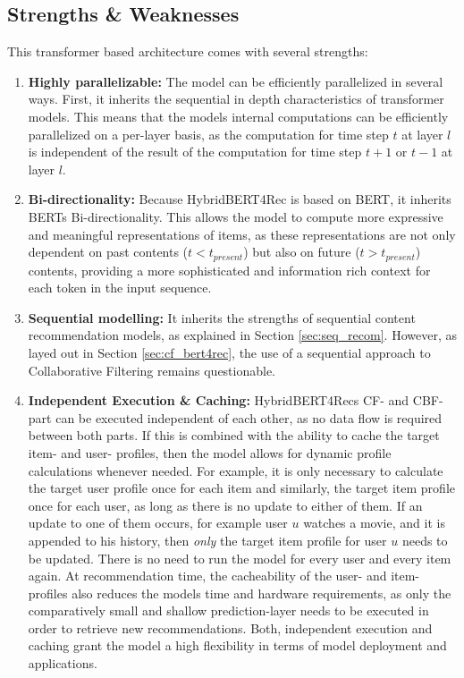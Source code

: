 \documentclass{Academic}
\begin{document}
        \subsection{Strengths \& Weaknesses}
        This transformer based architecture comes with several strengths:
        \begin{enumerate}
            \item \textbf{Highly parallelizable:} The model can be efficiently parallelized in several ways. First, it inherits the sequential in depth characteristics of transformer models. This means that the models internal computations can be efficiently parallelized on a per-layer basis, as the computation for time step $t$ at layer $l$ is independent of the result of the computation for time step $t+1$ or $t-1$ at layer $l$.
            \item \textbf{Bi-directionality:} Because HybridBERT4Rec is based on BERT, it inherits BERTs Bi-directionality. This allows the model to compute more expressive and meaningful representations of items, as these representations are not only dependent on past contents ($t < t_{present}$) but also on future ($t > t_{present}$) contents, providing a more sophisticated and information rich context for each token in the input sequence.
            \item \textbf{Sequential modelling:} It inherits the strengths of sequential content recommendation models, as explained in Section \ref{sec:seq_recom}. However, as layed out in Section \ref{sec:cf_bert4rec}, the use of a sequential approach to Collaborative Filtering remains questionable.
            \item \textbf{Independent Execution \& Caching:} HybridBERT4Recs CF- and CBF-part can be executed independent of each other, as no data flow is required between both parts. If this is combined with the ability to cache the target item- and user- profiles, then the model allows for dynamic profile calculations whenever needed. For example, it is only necessary to calculate the target user profile once for each item and similarly, the target item profile once for each user, as long as there is no update to either of them. If an update to one of them occurs, for example user $u$ watches a movie, and it is appended to his history, then \textit{only} the target item profile for user $u$ needs to be updated. There is no need to run the model for every user and every item again. At recommendation time, the cacheability of the user- and item-profiles also reduces the models time and hardware requirements, as only the comparatively small and shallow prediction-layer needs to be executed in order to retrieve new recommendations. Both, independent execution and caching grant the model a high flexibility in terms of model deployment and applications.
        \end{enumerate}
\end{document}
